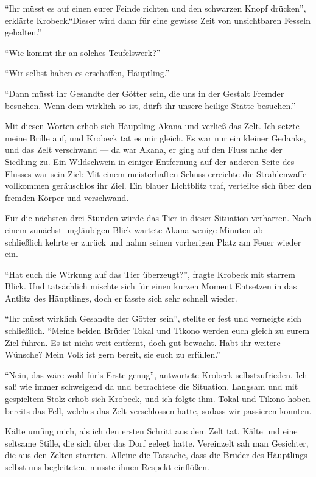 \enquote{Ihr müsst es auf einen eurer Feinde richten und den schwarzen Knopf drücken}, erklärte Krobeck.\enquote{Dieser wird dann für eine gewisse Zeit von unsichtbaren Fesseln gehalten.}

\enquote{Wie kommt ihr an solches Teufelswerk?}

\enquote{Wir selbst haben es erschaffen, Häuptling.}

\enquote{Dann müsst ihr Gesandte der Götter sein, die uns in der Gestalt Fremder besuchen. Wenn dem wirklich so ist, dürft ihr unsere heilige Stätte besuchen.}

Mit diesen Worten erhob sich Häuptling Akana und verließ das Zelt. Ich setzte meine Brille auf, und Krobeck tat es mir gleich. Es war nur ein kleiner Gedanke, und das Zelt verschwand --- da war Akana, er ging auf den Fluss nahe der Siedlung zu. Ein Wildschwein in einiger Entfernung auf der anderen Seite des Flusses war sein Ziel: Mit einem meisterhaften Schuss erreichte die Strahlenwaffe vollkommen geräuschlos ihr Ziel. Ein blauer Lichtblitz traf, verteilte sich über den fremden Körper und verschwand.

Für die nächsten drei Stunden würde das Tier in dieser Situation verharren. Nach einem zunächst ungläubigen Blick wartete Akana wenige Minuten ab --- schließlich kehrte er zurück und nahm seinen vorherigen Platz am Feuer wieder ein.

\enquote{Hat euch die Wirkung auf das Tier überzeugt?}, fragte Krobeck mit starrem Blick. Und tatsächlich mischte sich für einen kurzen Moment Entsetzen in das Antlitz des Häuptlings, doch er fasste sich sehr schnell wieder.

\enquote{Ihr müsst wirklich Gesandte der Götter sein}, stellte er fest und verneigte sich schließlich. \enquote{Meine beiden Brüder Tokal und Tikono werden euch gleich zu eurem Ziel führen. Es ist nicht weit entfernt, doch gut bewacht. Habt ihr weitere Wünsche? Mein Volk ist gern bereit, sie euch zu erfüllen.}

\enquote{Nein, das wäre wohl für's Erste genug}, antwortete Krobeck selbstzufrieden. Ich saß wie immer schweigend da und betrachtete die Situation. Langsam und mit gespieltem Stolz erhob sich Krobeck, und ich folgte ihm. Tokal und Tikono hoben bereits das Fell, welches das Zelt verschlossen hatte, sodass wir passieren konnten.

Kälte umfing mich, als ich den ersten Schritt aus dem Zelt tat. Kälte und eine seltsame Stille, die sich über das Dorf gelegt hatte. Vereinzelt sah man Gesichter, die aus den Zelten starrten. Alleine die Tatsache, dass die Brüder des Häuptlings selbst uns begleiteten, musste ihnen Respekt einflößen.

